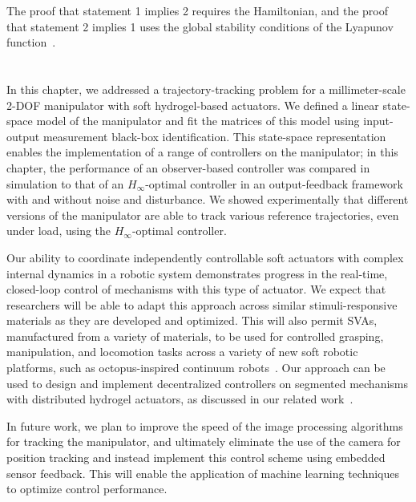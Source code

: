 The proof that statement 1 implies 2 requires the Hamiltonian, and the proof that statement 2 implies 1 uses the global stability conditions of the Lyapunov function~\cite{Boyd1994}.
\section{}

In this chapter, we addressed a trajectory-tracking problem for a millimeter-scale 2-DOF manipulator with soft hydrogel-based actuators. We defined a linear state-space model of the manipulator and fit the matrices of this model using input-output measurement black-box identification. This state-space representation enables the implementation of a range of controllers on the manipulator; in this chapter, the performance of an observer-based controller was compared in simulation to that of an $H_{\infty}$-optimal controller in an output-feedback framework with and without noise and disturbance. We showed experimentally that different versions of the manipulator are able to track various reference trajectories, even under load, using the $H_{\infty}$-optimal controller.

Our ability to coordinate independently controllable soft actuators with complex internal dynamics in a robotic system demonstrates progress in the real-time, closed-loop control of mechanisms with this type of actuator. We expect that researchers will be able to adapt this approach across similar stimuli-responsive materials as they are developed and optimized. This will also permit SVAs, manufactured from a variety of materials, to be used for controlled grasping, manipulation, and locomotion tasks across a variety of new soft robotic platforms, such as octopus-inspired continuum robots~\cite{Doroudchi2020}. Our approach can be used to design and implement decentralized controllers on segmented mechanisms with distributed hydrogel actuators, as discussed in our related work~\cite{Doroudchi2020,Doroudchi2019}.

In future work, we plan to improve the speed of the image processing algorithms for tracking the manipulator, and ultimately eliminate the use of the camera for position tracking and instead implement this control scheme using embedded sensor feedback.  This will enable the application of machine learning techniques to optimize control performance.

